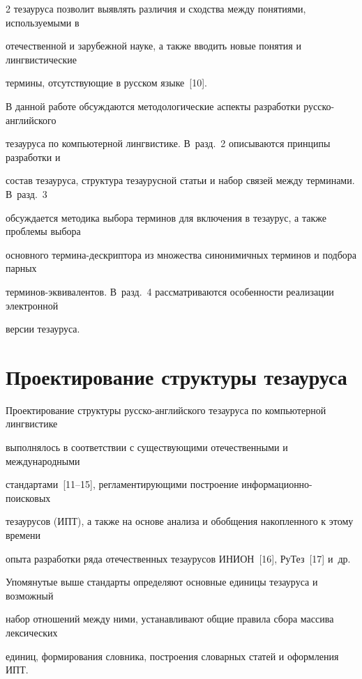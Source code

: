 \begin{multicols}{2}
тезауруса позволит выявлять различия и сходства между понятиями, используемыми в 

отечественной и зарубежной науке, а также вводить новые понятия и лингвистические 

термины, отсутствующие в русском языке~[10].

  

  В данной работе обсуждаются методологические аспекты разработки русско-английского 

тезауруса по компьютерной лингвистике. В~разд.~2 описываются принципы разработки и 

состав тезауруса, структура тезаурусной статьи и набор связей между терминами. В~разд.~3 

обсуждается методика выбора терминов для включения в тезаурус, а также проблемы выбора 

основного тер\-ми\-на-де\-скрип\-то\-ра из множества синонимичных терминов и подбора парных 

тер\-ми\-нов-экви\-ва\-лен\-тов. В~разд.~4 рас\-смат\-ри\-ва\-ют\-ся особенности реализации электронной 

версии тезауруса.



\section{Проектирование структуры тезауруса }



  Проектирование структуры русско-английского тезауруса по компьютерной лингвистике 

выполнялось в соответствии с существующими отечественными и международными 

стандартами~[11--15], регламентирующими построение информационно-поисковых 

тезаурусов (ИПТ), а также на основе анализа и обобщения накопленного к этому времени 

опыта разработки ряда отечественных тезаурусов ИНИОН~[16], РуТез~[17] и~др. 

  

  Упомянутые выше стандарты определяют основные единицы тезауруса и возможный 

набор отношений между ними, устанавливают общие правила сбора массива лексических 

единиц, формирования словника, построения словарных статей и оформления ИПТ.

  


\end{multicols}

